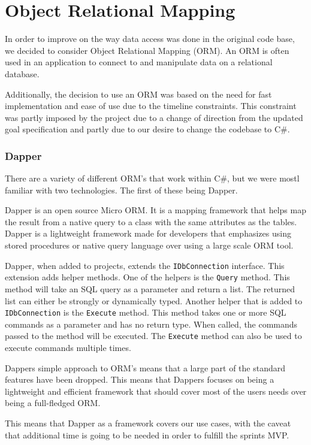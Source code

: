 \section{Object Relational Mapping}
In order to improve on the way data access was done in the original code base, we decided to consider Object Relational Mapping (ORM). An ORM is often used in an application to connect to and manipulate data on a relational database\cite{ORM}. 

Additionally, the decision to use an ORM was based on the need for fast implementation and ease of use due to the timeline constraints. This constraint was partly imposed by the \knox{} project due to a change of direction from the updated goal specification and partly due to our desire to change the codebase to C\#. 

\subsubsection{Dapper}
There are a variety of different ORM's that work within C\#, but we were mostl familiar with two technologies. The first of these being Dapper.
 
Dapper is an open source Micro ORM. It is a mapping framework that helps map the result from a native query to a class with the same attributes as the tables. Dapper is a lightweight framework made for developers that emphasizes using stored procedures or native query language over using a large scale ORM tool. 


Dapper, when added to projects, extends the \texttt{IDbConnection} interface. This extension adds helper methods. 
One of the helpers is the \texttt{Query} method. This method will take an SQL query as a parameter and return a list. The returned list can either be strongly or dynamically typed.
Another helper that is added to \texttt{IDbConnection} is the \texttt{Execute} method. This method takes one or more SQL commands as a parameter and has no return type. When called, the commands passed to the method will be executed. The \texttt{Execute} method can also be used to execute commands multiple times\cite{Dapper_Git}.

Dappers simple approach to ORM's means that a large part of the standard features have been dropped. This means that Dappers focuses on being a lightweight and efficient framework that should cover most of the users needs over being a full-fledged ORM\cite{Dapper_Git}.

This means that Dapper as a framework covers our use cases, with the caveat that additional time is going to be needed in order to fulfill the sprints MVP. 

